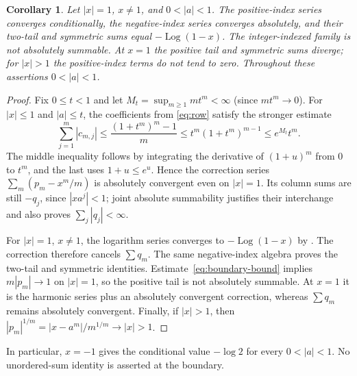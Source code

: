 \documentclass[11pt]{article}
\newtheorem{corollary}[theorem]{Corollary}
\DeclareMathOperator{\Log}{Log}
\begin{document}
\begin{corollary}\label{cor:boundary}
Let $|x|=1$, $x\ne1$, and $0<|a|<1$. The positive-index series
converges conditionally, the negative-index series converges absolutely,
and their two-tail and symmetric sums equal $-\Log(1-x)$.
The integer-indexed family is not absolutely summable. At $x=1$ the
positive tail and symmetric sums diverge; for $|x|>1$ the positive-index
terms do not tend to zero. Throughout these assertions $0<|a|<1$.
\end{corollary}
\begin{proof}
Fix $0\leq t<1$ and let $M_t=\sup_{m\geq1}mt^m<\infty$
(since $mt^m\to0$).
For $|x|\leq1$ and $|a|\leq t$, the coefficients from
\eqref{eq:row} satisfy the stronger estimate
\begin{equation}\label{eq:boundary-bound}
 \sum_{j=1}^m|c_{m,j}|
 \leq\frac{(1+t^m)^m-1}{m}
 \leq t^m(1+t^m)^{m-1}
 \leq e^{M_t}t^m.
\end{equation}
The middle inequality follows by integrating the derivative of
$(1+u)^m$ from $0$ to $t^m$, and the last uses $1+u\leq e^u$.
Hence the correction series $\sum_m(p_m-x^m/m)$ is absolutely
convergent even on $|x|=1$. Its column sums are still $-q_j$, since
$|xa^j|<1$; joint absolute summability justifies their interchange and
also proves $\sum_j|q_j|<\infty$.

For $|x|=1$, $x\ne1$, the logarithm series converges to
$-\Log(1-x)$ by \cite[\S4.6, equation (4.6.1), with $z=-x$]{dlmf}.
The correction therefore cancels $\sum q_m$.
The same negative-index algebra proves the two-tail and symmetric
identities. Estimate~\eqref{eq:boundary-bound} implies
$m|p_m|\to1$ on $|x|=1$, so the positive tail is not absolutely
summable. At $x=1$ it is the harmonic series plus an absolutely
convergent correction, whereas $\sum q_m$ remains absolutely convergent.
Finally, if $|x|>1$, then
$|p_m|^{1/m}=|x-a^m|/m^{1/m}\to|x|>1$.
\end{proof}
In particular, $x=-1$ gives the conditional value $-\log2$ for every
$0<|a|<1$. No unordered-sum identity is asserted at the boundary.
\end{document}
